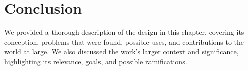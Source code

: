 \section{Conclusion}
We provided a thorough description of the design in this chapter, covering its conception, problems that were found, possible uses, and contributions to the world at large. We also discussed the work's larger context and significance, highlighting its relevance, goals, and possible ramifications.

